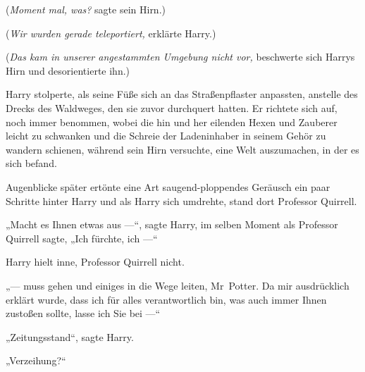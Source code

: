 (\emph{Moment mal, was?} sagte sein Hirn.)

(\emph{Wir wurden gerade teleportiert,} erklärte Harry.)

(\emph{Das kam in unserer angestammten Umgebung nicht vor,} beschwerte sich Harrys Hirn und desorientierte ihn.)

Harry stolperte, als seine Füße sich an das Straßenpflaster anpassten, anstelle des Drecks des Waldweges, den sie zuvor durchquert hatten. Er richtete sich auf, noch immer benommen, wobei die hin und her eilenden Hexen und Zauberer leicht zu schwanken und die Schreie der Ladeninhaber in seinem Gehör zu wandern schienen, während sein Hirn versuchte, eine Welt auszumachen, in der es sich befand.

Augenblicke später ertönte eine Art saugend-ploppendes Geräusch ein paar Schritte hinter Harry und als Harry sich umdrehte, stand dort Professor Quirrell.

„Macht es Ihnen etwas aus —“, sagte Harry, im selben Moment als Professor Quirrell sagte,
„Ich fürchte, ich —“

Harry hielt inne, Professor Quirrell nicht.

„— muss gehen und einiges in die Wege leiten, Mr~Potter. Da mir ausdrücklich erklärt wurde, dass ich für alles verantwortlich bin, was auch immer Ihnen zustoßen sollte, lasse ich Sie bei —“

„Zeitungsstand“, sagte Harry.

„Verzeihung?“

